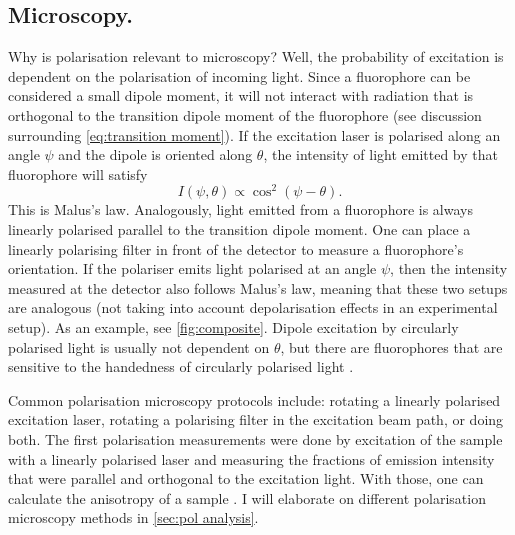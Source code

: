 \subsection{Microscopy.} Why is polarisation relevant to microscopy? Well, the probability of excitation is dependent on the polarisation of incoming light. Since a fluorophore can be considered a small dipole moment, it will not interact with radiation that is orthogonal to the transition dipole moment of the fluorophore (see discussion surrounding \autoref{eq:transition moment}). If the excitation laser is polarised along an angle $ \psi $ and the dipole is oriented along $ \theta $, the intensity of light emitted by that fluorophore will satisfy 
\begin{equation}
	\label{eq:malus}
	I(\psi, \theta) \propto \cos^2(\psi-\theta).
\end{equation}
This is Malus's law. Analogously, light emitted from a fluorophore is always linearly polarised parallel to the transition dipole moment. One can place a linearly polarising filter in front of the detector to measure a fluorophore's orientation. If the polariser emits light polarised at an angle $ \psi $, then the intensity measured at the detector also follows Malus's law, meaning that these two setups are analogous (not taking into account depolarisation effects in an experimental setup). As an example, see \autoref{fig:composite}. Dipole excitation by circularly polarised light is usually not dependent on $ \theta $, but there are fluorophores that are sensitive to the handedness of circularly polarised light \cite{Takaishi2019}.

Common polarisation microscopy protocols include: rotating a linearly polarised excitation laser, rotating a polarising filter in the excitation beam path, or doing both. The first polarisation measurements were done by excitation of the sample with a linearly polarised laser and measuring the fractions of emission intensity that were parallel and orthogonal to the excitation light. With those, one can calculate the anisotropy of a sample \cite{Camacho2019}. I will elaborate on different polarisation microscopy methods in \autoref{sec:pol analysis}. 

